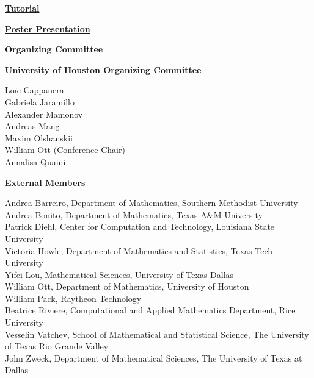 \vspace{4ex}
\noindent
\hyperref[tutorial]{{\bfseries\large  Tutorial}}
\vspace{2ex}

\vspace{4ex}
\noindent
\hyperref[poster]{{\bfseries\large  Poster Presentation}}
\vspace{2ex}

\newpage\newpage
\thispagestyle{empty}
\newpage
\clearpage


\thispagestyle{empty}
\label{committee}
\centerline{\bfseries\Large Organizing Committee}
\vspace{10ex}

\noindent
{\bfseries\large  University of Houston Organizing Committee}
\vspace{1ex}

\noindent
Loïc Cappanera\\
Gabriela Jaramillo\\
Alexander Mamonov\\
Andreas Mang\\
Maxim Olshanskii\\
William Ott (Conference Chair)\\
Annalisa Quaini

\vspace{4ex}

\noindent
{\bfseries\large  External Members}

\vspace{1ex}

\noindent
Andrea Barreiro, Department of Mathematics, Southern Methodist University\\
Andrea Bonito, Department of Mathematics, Texas A\&M University\\
Patrick Diehl, Center for Computation and Technology, Louisiana State University\\
Victoria Howle, Department of Mathematics and Statistics, Texas Tech University\\
Yifei Lou, Mathematical Sciences, University of Texas Dallas\\
William Ott, Department of Mathematics, University of Houston\\
William Pack, Raytheon Technology\\
Beatrice Riviere, Computational and Applied Mathematics Department, Rice University\\
Vesselin Vatchev, School of Mathematical and Statistical Science, The University of Texas Rio Grande Valley\\
John Zweck, Department of Mathematical Sciences, The University of Texas at Dallas\\


\clearpage
